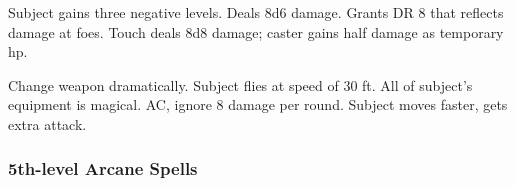 \begin{swspelllist}
   Subject gains three negative levels.
   Deals 8d6 damage.
   Grants DR 8 that reflects damage at foes.
   Touch deals 8d8 damage; caster gains half damage as temporary hp.

   Change weapon dramatically.
   Subject flies at speed of 30 ft.
   All of subject's equipment is magical.
    AC, ignore 8 damage per round.
   Subject moves faster, gets extra attack.
\end{swspelllist}

\subsubsection{5th-level Arcane Spells} 
